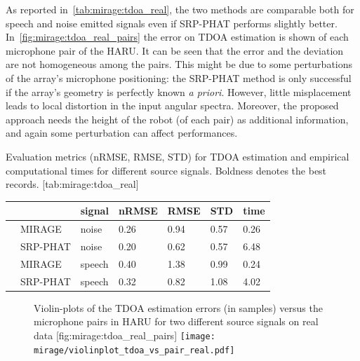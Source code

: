As reported in~\cref{tab:mirage:tdoa_real}, the two methods are comparable both for speech and noise emitted signals even if \ac{SRP-PHAT} performs slightly better.
In~\cref{fig:mirage:tdoa_real_pairs} the error on \ac{TDOA} estimation is shown of each microphone pair of the HARU.
It can be seen that the error and the deviation are not homogeneous among the pairs.
This might be due to some perturbations of the array's microphone positioning: the \ac{SRP-PHAT} method is only successful if the array's geometry is perfectly known \textit{a priori}.
However, little misplacement leads to local distortion in the input angular spectra.
Moreover, the proposed approach needs the height of the robot (of each pair) as additional information, and again some perturbation can affect performances.

\begin{table}[h]
    \begin{sidecaption}[]{
        Evaluation metrics (\ac{nRMSE}, \ac{RMSE}, \ac{STD}) for TDOA estimation and empirical computational times for different source signals.
        Boldness denotes the best records.
    }[tab:mirage:tdoa_real]
    \centering
    \small
    \begin{tabular*}{\linewidth}{@{\extracolsep{\fill}}lllllll@{}}
        \toprule
        & &     signal &     nRMSE & RMSE &  STD &      time \\
        \midrule
        & MIRAGE  &       noise &  0.26 &  0.94 &  0.57 &  0.26 \\
        & SRP-PHAT &      noise &  0.20 &  0.62 &  0.57 &  6.48 \\
        \midrule
        & MIRAGE &       speech &  0.40 &  1.38 &  0.99 &  0.24 \\
        & SRP-PHAT &     speech &  0.32 &  0.82 &  1.08 &  4.02 \\
        \bottomrule
        \end{tabular*}
    \end{sidecaption}
\end{table}

\begin{figure}
    \begin{sidecaption}[]{
        Violin-plots of the TDOA estimation errors (in samples) versus the microphone pairs in HARU for two different source signals on real data
    }[fig:mirage:tdoa_real_pairs]
        \centering
        \texttt{[image: mirage/violinplot\_tdoa\_vs\_pair\_real.pdf]}
    \end{sidecaption}
\end{figure}

